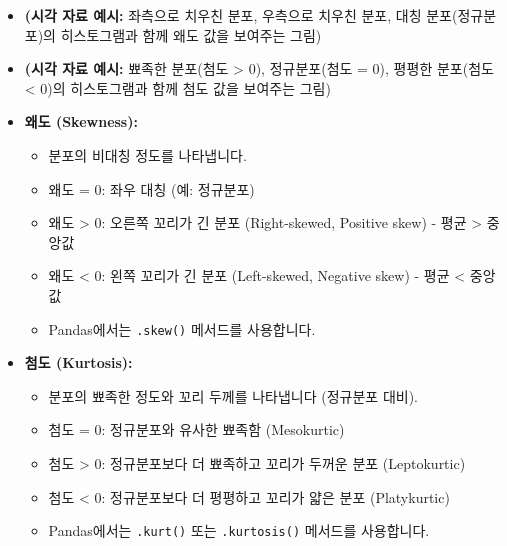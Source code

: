 \documentclass[
  letterpaper,
]{book}
\providecommand{\tightlist}{%
  \setlength{\itemsep}{0pt}\setlength{\parskip}{0pt}}
\begin{document}
\begin{itemize}
\item
  \textbf{(시각 자료 예시:} 좌측으로 치우친 분포, 우측으로 치우친 분포,
  대칭 분포(정규분포)의 히스토그램과 함께 왜도 값을 보여주는 그림)
\item
  \textbf{(시각 자료 예시:} 뾰족한 분포(첨도 \textgreater{} 0),
  정규분포(첨도 = 0), 평평한 분포(첨도 \textless{} 0)의 히스토그램과
  함께 첨도 값을 보여주는 그림)
\item
  \textbf{왜도 (Skewness):}

  \begin{itemize}
  \tightlist
  \item
    분포의 비대칭 정도를 나타냅니다.
  \item
    왜도 = 0: 좌우 대칭 (예: 정규분포)
  \item
    왜도 \textgreater{} 0: 오른쪽 꼬리가 긴 분포 (Right-skewed, Positive
    skew) - 평균 \textgreater{} 중앙값
  \item
    왜도 \textless{} 0: 왼쪽 꼬리가 긴 분포 (Left-skewed, Negative skew)
    - 평균 \textless{} 중앙값
  \item
    Pandas에서는 \texttt{.skew()} 메서드를 사용합니다.
  \end{itemize}
\item
  \textbf{첨도 (Kurtosis):}

  \begin{itemize}
  \tightlist
  \item
    분포의 뾰족한 정도와 꼬리 두께를 나타냅니다 (정규분포 대비).
  \item
    첨도 = 0: 정규분포와 유사한 뾰족함 (Mesokurtic)
  \item
    첨도 \textgreater{} 0: 정규분포보다 더 뾰족하고 꼬리가 두꺼운 분포
    (Leptokurtic)
  \item
    첨도 \textless{} 0: 정규분포보다 더 평평하고 꼬리가 얇은 분포
    (Platykurtic)
  \item
    Pandas에서는 \texttt{.kurt()} 또는 \texttt{.kurtosis()} 메서드를
    사용합니다.
  \end{itemize}
\end{itemize}
\end{document}

